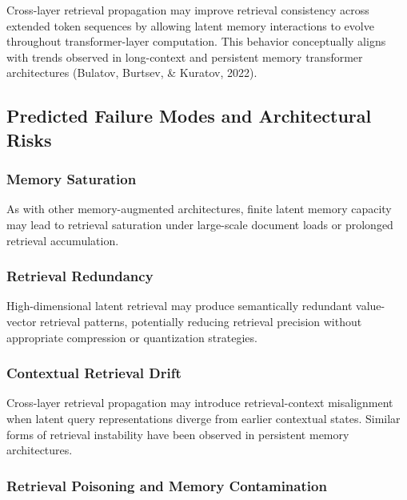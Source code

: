 \documentclass[
]{article}
\begin{document}
Cross-layer retrieval propagation may improve retrieval consistency
across extended token sequences by allowing latent memory interactions
to evolve throughout transformer-layer computation. This behavior
conceptually aligns with trends observed in long-context and persistent
memory transformer architectures (Bulatov, Burtsev, \& Kuratov, 2022).

\hypertarget{predicted-failure-modes-and-architectural-risks}{%
\subsection{\texorpdfstring{ Predicted Failure Modes and Architectural
Risks}{ Predicted Failure Modes and Architectural Risks}}\label{predicted-failure-modes-and-architectural-risks}}

\hypertarget{memory-saturation}{%
\subsubsection{Memory Saturation}\label{memory-saturation}}

As with other memory-augmented architectures, finite latent memory
capacity may lead to retrieval saturation under large-scale document
loads or prolonged retrieval accumulation.

\hypertarget{retrieval-redundancy}{%
\subsubsection{Retrieval Redundancy}\label{retrieval-redundancy}}

High-dimensional latent retrieval may produce semantically redundant
value-vector retrieval patterns, potentially reducing retrieval
precision without appropriate compression or quantization strategies.

\hypertarget{contextual-retrieval-drift}{%
\subsubsection{Contextual Retrieval
Drift}\label{contextual-retrieval-drift}}

Cross-layer retrieval propagation may introduce retrieval-context
misalignment when latent query representations diverge from earlier
contextual states. Similar forms of retrieval instability have been
observed in persistent memory architectures.

\hypertarget{retrieval-poisoning-and-memory-contamination}{%
\subsubsection{Retrieval Poisoning and Memory
Contamination}\label{retrieval-poisoning-and-memory-contamination}}
\end{document}
